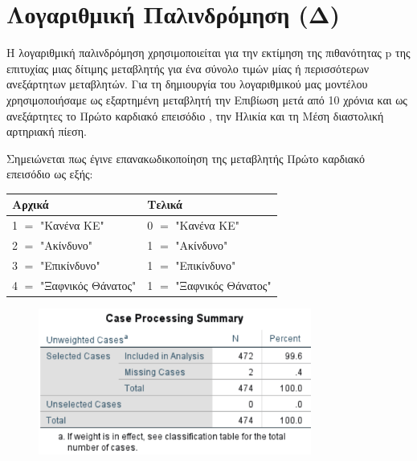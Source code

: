 \clearpage
\section{Λογαριθμική Παλινδρόμηση (Δ)}

Η λογαριθμική παλινδρόμηση χρησιμοποιείται για την εκτίμηση της πιθανότητας p της επιτυχίας μιας δίτιμης μεταβλητής για ένα σύνολο τιμών μίας ή περισσότερων ανεξάρτητων μεταβλητών. 
Για τη δημιουργία του λογαριθμικού μας μοντέλου χρησιμοποιήσαμε ως εξαρτημένη μεταβλητή την Επιβίωση μετά από 10 χρόνια και ως ανεξάρτητες το Πρώτο καρδιακό επεισόδιο , την Ηλικία και τη Μέση διαστολική αρτηριακή πίεση. 

Σημειώνεται πως έγινε επανακωδικοποίηση της μεταβλητής Πρώτο καρδιακό επεισόδιο ως εξής:



\begin{center}
 \begin{tabular}{|l|l|} 
 \hline
\hspace{1.2cm} \textbf{Αρχικά} & \hspace{1.2cm} \textbf{Τελικά} \\ [0.5ex]
 \hline
 1 $=$ "Κανένα ΚΕ" & 0 $=$ "Κανένα ΚΕ" \\ 
 \hline
 2 $=$ "Ακίνδυνο" & 1 $=$ "Ακίνδυνο"\\
 \hline
 3 $=$ "Επικίνδυνο"& 1 $=$ "Επικίνδυνο" \\
 \hline
 4 $=$ "Ξαφνικός Θάνατος"& 1 $=$ "Ξαφνικός Θάνατος" \\
 \hline
\end{tabular}
\end{center}



\vspace{1cm}
\begin{figure}[h]
    \centering
    \includegraphics[width=0.8\textwidth]{images/501.PNG}
\end{figure}

